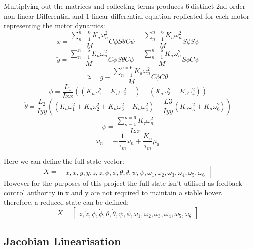 \documentclass[12pt,a4paper,twoside]{report}
\begin{document}
				Multiplying out the matrices and collecting terms produces 6 distinct 2nd order non-linear Differential and 1 linear differential equation replicated for each motor representing the motor dynamics:
				\\
				\[\ddot{x} = \frac{\sum_{n=1}^{n=6}K_a \omega_n^2}{M}C\phi S\theta C\psi  + \frac{\sum_{n=1}^{n=6}K_a \omega_n^2}{M}S\phi S\psi \]
				\[\ddot{y} = \frac{\sum_{n=1}^{n=6}K_a \omega_n^2}{M}C\phi S\theta C\psi  - \frac{\sum_{n=1}^{n=6}K_a \omega_n^2}{M}S\phi C\psi \]
				\[\ddot{z} = g - \frac{\sum_{n=1}^{n=6}K_a \omega_n^2}{M}C\phi C\theta \]
				\[\ddot{\phi} = \frac{L_1}{Ixx} ((K_a \omega_1^2+K_a \omega_2^2 +) - (K_a \omega_3^2+K_a \omega_4^2)) \]
				\[\ddot{\theta} = \frac{L_2}{Iyy} ((K_a \omega_1^2+K_a \omega_2^2+K_a \omega_3^2+K_a \omega_4^2) - \frac{L3}{Iyy} (K_a \omega_5^2+K_a \omega_6^2)) \]
				\[\ddot{\psi} = \frac{\sum_{n = 1}^{n = 6}K_\tau \omega_n^2}{Izz} \]
				\[\dot{\omega_n} = -\frac{1}{\tau_m}\omega_n	 + \frac{K_u}{\tau_m}\mu_n\]
				
				Here we can define the full state vector:
				$$
				X =
				\begin{bmatrix}
					x,\dot{x},y,\dot{y},z,\dot{z},\phi,\dot{\phi},\theta,\dot{\theta},\psi,\dot{\psi},\omega_1,\omega_2,\omega_3,\omega_4,\omega_5,\omega_6
				\end{bmatrix}
				$$
				However for the purposes of this project the full state isn't utilised as feedback control authority in x and y are not required to maintain a stable hover. therefore, a reduced state can be defined: 
				$$
				X =
				\begin{bmatrix}
				z,\dot{z},\phi,\dot{\phi},\theta,\dot{\theta},\psi,\dot{\psi},\omega_1,\omega_2,\omega_3,\omega_4,\omega_5,\omega_6
				\end{bmatrix}
				$$
				
				\subsection*{Jacobian Linearisation}
					
\end{document}

